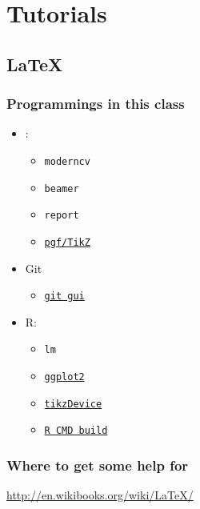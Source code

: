 \section{Tutorials}

\subsection{\LaTeX}

\begin{frame}
    \frametitle{Programmings in this class}
    \begin{itemize}
        \item \LaTeXs: 
            \begin{itemize}
                \item \texttt{moderncv}
                \item \texttt{beamer}
                \item \texttt{report}
                \item \href{http://www.texample.net}{\texttt{pgf/TikZ}}
            \end{itemize}
        \item Git
            \begin{itemize}
                \item \href{http://git-scm.com/doc}{\texttt{git gui}}
            \end{itemize}
        \item R:
            \begin{itemize}
                \item \texttt{lm}
                \item \href{https://catalyst.library.jhu.edu/catalog/bib_3642743}{\texttt{ggplot2}}
                \item \href{http://www.texample.net/tikz/examples/tikzdevice-demo/}{\texttt{tikzDevice}}
                \item \href{http://www.public.iastate.edu/~dicook/VIGRE/R-packages-slides.pdf}{\texttt{R CMD build}}
            \end{itemize}
    \end{itemize}
\end{frame}


\begin{frame}[fragile]
    \frametitle{Where to get some help for \LaTeXs}
    \begin{center}
    \href{http://en.wikibooks.org/wiki/LaTeX/}{http://en.wikibooks.org/wiki/LaTeX/}
    \end{center}
\end{frame}

